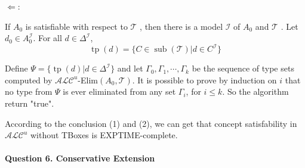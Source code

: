 \documentclass[12pt]{article}
\begin{document}
    $\Longleftarrow:$ \par
    If  $A_{0} $ is satisfiable with respect to  $\mathcal{T}$ , then there is a model $ \mathcal{I}$  of $ A_{0}$  and  $\mathcal{T}$ . Let $ d_{0} \in A_{0}^{\mathcal{I}} $. For all $d \in \Delta^{\mathcal{I}}$, 
    $$
    \operatorname{tp}(d) = \{ C \in \operatorname{sub}(\mathcal{T}) | d \in C^{\mathcal{I}} \}
    $$ \par
    Define $\Psi = \{ \operatorname{tp}(d) | d \in \Delta^{\mathcal{I}} \}$ and let  $\Gamma_0, \Gamma_1, \cdots, \Gamma_{k}$ be the sequence of type sets computed by $\mathcal{ALC}^{u}$-Elim$(A_0, \mathcal{T})$. It is possible to prove by induction on $i$ that no type from $\Psi$ is ever eliminated from any set $\Gamma_i$, for $i \le k$. So the algorithm return "true". \par

    According to the conclusion (1) and (2), we can get that concept satisfability in $\mathcal{ALC}^{u}$ without TBoxes is EXPTIME-complete.

    \newpage
    \paragraph{Question 6. Conservative Extension}~{}
    \\
\end{document}
